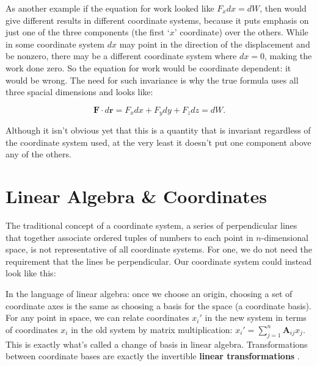 	
	As another example if the equation for work looked like $F_x dx = dW$, then would give different results in different coordinate systems, because it puts emphasis on just one of the three components (the first `$x$' coordinate) over the others. While in some coordinate system $dx$ may point in the direction of the displacement and be nonzero, there may be a different coordinate system where $dx=0$, making the work done zero. So the equation for work would be coordinate dependent: it would be wrong. The need for such invariance is why the true formula uses all three spacial dimensions and looks like:
	
	\begin{equation*}
		\mathbf F \cdot  d \mathbf r = F_x dx + F_y dy + F_z dz = d W.
	\end{equation*}
	
	 Although it isn't obvious yet that this is a quantity that is invariant regardless of the coordinate system used, at the very least it doesn't put one component above any of the others.

	
	
	\section{Linear Algebra \& Coordinates} 
	\label{sec:Linear Algebra & Coordinates}%
	
	
	The traditional concept of a coordinate system, a series of perpendicular lines that together associate ordered tuples of numbers to each point in $n$-dimensional space, is not representative of all coordinate systems. For one, we do not need the requirement that the lines be perpendicular. Our coordinate system could instead look like this:
	
	
	In the language of linear algebra: once we choose an origin, choosing a set of coordinate axes is the same as choosing a basis for the space (a coordinate basis). For any point in space, we can relate coordinates $x_i'$ in the new system in terms of coordinates $x_i$ in the old system by matrix multiplication: $x_i' = \sum_{j=1}^n \mathbf A_{ij} x_j$. This is exactly what's called a change of basis in linear algebra. Transformations between coordinate bases are exactly the invertible \textbf{linear transformations} .
	
